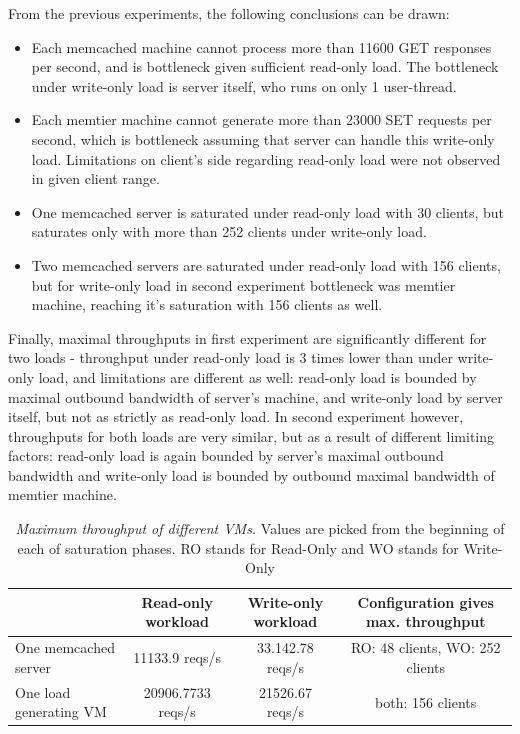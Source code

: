 \documentclass[11pt,a4paper]{article}
\begin{document}
From the previous experiments, the following conclusions can be drawn:
\begin{itemize}
	\item Each memcached machine cannot process more than 11600 GET responses per second, and is bottleneck given sufficient read-only load. The bottleneck under write-only load is server itself, who runs on only 1 user-thread.
	\item Each memtier machine cannot generate more than 23000 SET requests per second, which is bottleneck assuming that server can handle this write-only load. Limitations on client's side regarding read-only load were not observed in given client range.
	\item One memcached server is saturated under read-only load with 30 clients, but saturates only with more than 252 clients under write-only load.
	\item Two memcached servers are saturated under read-only load with 156 clients, but for write-only load in second experiment bottleneck was memtier machine, reaching it's saturation with 156 clients as well.
\end{itemize}

Finally, maximal throughputs in first experiment are significantly different for two loads - throughput under read-only load is 3 times lower than under write-only load, and limitations are different as well: read-only load is bounded by maximal outbound bandwidth of server's machine, and write-only load by server itself, but not as strictly as read-only load. In second experiment however, throughputs for both loads are very similar, but as a result of different limiting factors: read-only load is again bounded by server's maximal outbound bandwidth and write-only load is bounded by outbound maximal bandwidth of memtier machine.

\begin{center}
	\scriptsize{	
		\begin{table}[ht!]
			\centering
			\begin{tabulary}{\linewidth}{ | L | C | C | C |}
				\hline	&	Read-only workload & Write-only workload & Configuration gives max. throughput	\\
				\hline One memcached server	&	11133.9 reqs/s	&	33.142.78 reqs/s	&	RO: 48 clients, WO: 252 clients	\\
				\hline One load generating VM	&	20906.7733 reqs/s	&	21526.67 reqs/s	&	both: 156 clients	\\
				\hline 
			\end{tabulary}
			\caption{\textit{Maximum throughput of different VMs.} Values are picked from the beginning of each of saturation phases. RO stands for Read-Only and WO stands for Write-Only}
			\label{table:baseline_nomidd:max_xput}
		\end{table}
	}
\end{center}
\end{document}
